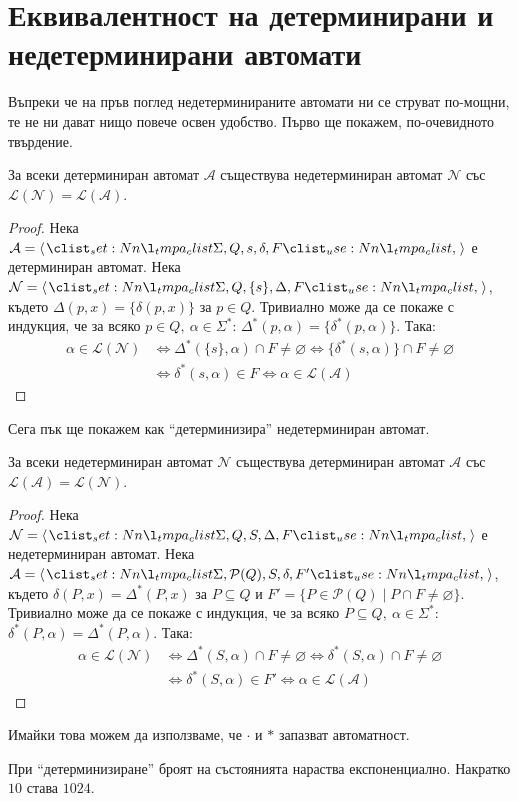 \section{Еквивалентност на детерминирани и недетерминирани автомати}

Въпреки че на пръв поглед недетерминираните автомати ни се струват по-мощни, те не ни дават нищо повече освен удобство.
Първо ще покажем, по-очевидното твърдение.

\begin{claim}
    За всеки детерминиран автомат $\mathcal{A}$ съществува недетерминиран автомат $\mathcal{N}$ със $\mathcal{L(N) = L(A)}$.
\end{claim}

\begin{proof}
    Нека $\mathcal{A} = \opair{\Sigma, Q, s, \delta, F}$ е детерминиран автомат.
    Нека $\mathcal{N} = \opair{\Sigma, Q, \{ s \}, \Delta, F}$,
    където $\Delta(p, x) = \{ \delta(p, x) \}$ за $p \in Q$.
    Тривиално може да се покаже с индукция, че за всяко $p \in Q, \: \alpha \in \Sigma^*$: $\Delta^*(p, \alpha) = \{ \delta^*(p, \alpha) \}$.
    Така:
    \begin{align*}
        \alpha \in \mathcal{L(N)} & \iff \Delta^*(\{ s \}, \alpha) \cap F \neq \varnothing \iff \{ \delta^*(s, \alpha) \} \cap F \neq \varnothing \\
                                  & \iff \delta^*(s, \alpha) \in F \iff \alpha \in \mathcal{L(A)}
    \end{align*}
\end{proof}

Сега пък ще покажем как ``детерминизира'' недетерминиран автомат.

\begin{claim}
    За всеки недетерминиран автомат $\mathcal{N}$ съществува детерминиран автомат $\mathcal{A}$ със $\mathcal{L(A) = L(N)}$.
\end{claim}

\begin{proof}
    Нека $\mathcal{N} = \opair{\Sigma, Q, S, \Delta, F}$ е недетерминиран автомат.
    Нека $\mathcal{A} = \opair{\Sigma, \mathcal{P}(Q), S, \delta, F'}$,
    където $\delta(P, x) = \Delta^*(P, x)$ за $P \subseteq Q$ и $F' = \{ P \in \mathcal{P}(Q) \mid P \cap F \neq \varnothing \}$.
    Тривиално може да се покаже с индукция, че за всяко $P \subseteq Q, \: \alpha \in \Sigma^*$: $\delta^*(P, \alpha) = \Delta^*(P, \alpha)$.
    Така:
    \begin{align*}
        \alpha \in \mathcal{L(N)} & \iff \Delta^*(S, \alpha) \cap F \neq \varnothing \iff \delta^*(S, \alpha) \cap F \neq \varnothing \\
                                  & \iff \delta^*(S, \alpha) \in F' \iff \alpha \in \mathcal{L(A)}
    \end{align*}
\end{proof}

Имайки това можем да използваме, че $\cdot$ и $*$ запазват автоматност.
\begin{warning}
    При ``детерминизиране'' броят на състоянията нараства експоненциално.
    Накратко $10$ става $1024$.
\end{warning}
